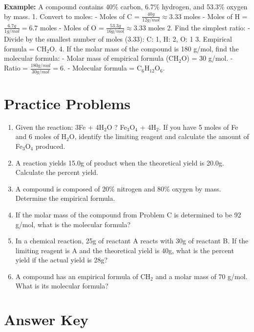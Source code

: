 \documentclass{article}
\begin{document}
\textbf{Example:} A compound contains 40\% carbon, 6.7\% hydrogen, and 53.3\% oxygen by mass.  
1. Convert to moles:
   - Moles of C = \( \frac{40g}{12g/mol} \approx 3.33 \) moles  
   - Moles of H = \( \frac{6.7g}{1g/mol} = 6.7 \) moles  
   - Moles of O = \( \frac{53.3g}{16g/mol} \approx 3.33 \) moles  
2. Find the simplest ratio:
   - Divide by the smallest number of moles (3.33): C: 1, H: 2, O: 1
3. Empirical formula = CH\(_2\)O.  
4. If the molar mass of the compound is 180 g/mol, find the molecular formula:
   - Molar mass of empirical formula (CH\(_2\)O) = 30 g/mol.  
   - Ratio = \( \frac{180g/mol}{30g/mol} = 6 \).  
   - Molecular formula = C\(_6\)H\(_{12}\)O\(_6\).

\section*{Practice Problems}

\begin{enumerate}[label=\Alph*.]
    \item Given the reaction: 3Fe + 4H\(_2\)O ? Fe\(_3\)O\(_4\) + 4H\(_2\). If you have 5 moles of Fe and 6 moles of H\(_2\)O, identify the limiting reagent and calculate the amount of Fe\(_3\)O\(_4\) produced.
    
    \item A reaction yields 15.0g of product when the theoretical yield is 20.0g. Calculate the percent yield.
    
    \item A compound is composed of 20\% nitrogen and 80\% oxygen by mass. Determine the empirical formula.
    
    \item If the molar mass of the compound from Problem C is determined to be 92 g/mol, what is the molecular formula?
    
    \item In a chemical reaction, 25g of reactant A reacts with 30g of reactant B. If the limiting reagent is A and the theoretical yield is 40g, what is the percent yield if the actual yield is 28g?
    
    \item A compound has an empirical formula of CH\(_2\) and a molar mass of 70 g/mol. What is its molecular formula?
\end{enumerate}

\section*{Answer Key}
\end{document}

